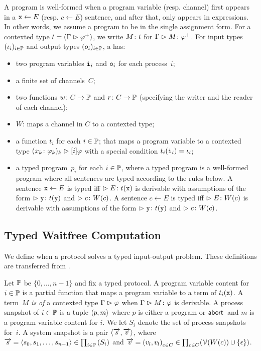 {\newcommand{\Wg}{W_{\mathrm g}}
\newcommand{\Wd}{W_{\mathrm d}}
A program is well-formed when
a program variable (resp. channel) first appears in a $\texttt{x}\leftarrow E$
(resp. $c\leftarrow E$)
sentence, and
after that, only appears in expressions.
In other words, we assume a program to be in the single assignment form.
For a contexted type $t = (\Gamma\vartriangleright{\varphi}^+)$,
we write ${M} \colon{t}$ for
$\Gamma\vartriangleright{M} \colon{{\varphi}^+}$.
For input types $(\iota_i)_{i\in\mathbb{P}}$
and output types $(o_i)_{i\in\mathbb{P}}$,
a  has:
\begin{itemize}
 \item two program variables
      $\texttt{i}_i$ and $\texttt{o}_i$ for each process~$i$;
 \item a finite set of channels~$C$;
 \item two functions $w\colon C\rightarrow \mathbb{P}$
       and $r\colon C\rightarrow
       \mathbb{P}$ (specifying the writer and the reader of
       each channel);
 \item $W$: maps a channel in $C$ to a contexted type;
 \item a function $t_i$ for each $i\in \mathbb{P}$;
       that maps a program variable to a contexted type
       $({x_k} \colon{\varphi_k})_k \vartriangleright[i]\varphi$ with a special condition
       $t_i(\texttt{i}_i)= \iota_i$;
 \item a typed program~$p_i$ for each $i\in \mathbb{P}$,
       where
       a typed program is a well-formed program where all
       sentences are typed according to the rules below.
       A sentence $\texttt{x} \leftarrow E$ is typed  iff $\vartriangleright E\colon t(\texttt{x})$ is derivable with
       assumptions of the form $\vartriangleright{\texttt{y}} \colon{t(\texttt{y})}$ and $\vartriangleright{c} \colon{W(c)}$.
       A sentence $c\leftarrow E$ is typed iff
       $\vartriangleright{E} \colon{W(c)}$ is derivable
       with
       assumptions of the form $\vartriangleright{\texttt{y}} \colon{t(\texttt{y})}$ and $\vartriangleright{c} \colon{W(c)}$.
\end{itemize}

\subsection{Typed Waitfree Computation}

We define when a protocol solves a typed
input-output problem.
These definitions are transferred from \citet{Saks:1993vq}.

Let $\mathbb{P}$ be $\{0,\ldots, n-1\}$ and fix
a typed protocol.
A program variable content for $i\in\mathbb{P}$ is a
partial
function
that maps a program variable to a term of $t_i(\texttt{x})$.
A term~$M$ \textit{is of} a contexted type $\Gamma\vartriangleright\varphi$ when
$\Gamma\vartriangleright
{M} \colon{\varphi}$ is derivable.
A process snapshot of $i\in\mathbb{P}$ is a tuple
$\langle{p,m}\rangle$ where $p$ is either a program or $\mathsf{abort\,}$ and $m$ is a
program variable content for $i$.
We let $S_i$ denote the set of process snapshots for~$i$.
A system snapshot
is a pair $\langle{\overrightarrow s, \overrightarrow v}\rangle$, where $\overrightarrow s = \langle{s_0,
{s_1,{\ldots,s_{n-1}}}}\rangle \in
\prod_{i\in \mathbb{P}}\left(S_i\right)
$
and
$\overrightarrow v =
\left({v}_{l}, {v}_{l}\right)_{c\in C} \in \prod_{c\in C}(\mathcal{V}(W(c))\cup\{\epsilon\})
$.

}
